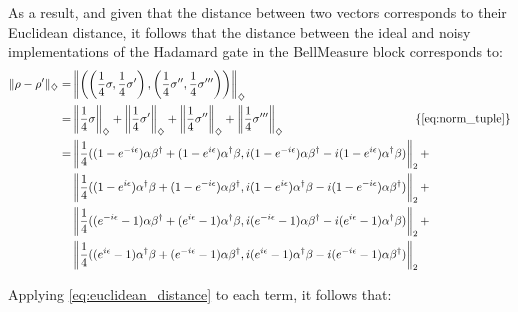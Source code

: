 As a result, and given that the distance between two vectors corresponds to their Euclidean distance, it follows that the distance between the ideal and noisy implementations of the Hadamard gate in the BellMeasure block corresponds to:
\begin{equation}
  \begin{split}
  \lVert \rho-\rho' \rVert_{\diamondsuit} = & \left\lVert \left( \left( \frac{1}{4} \sigma,\frac{1}{4} \sigma'  \right),  \left(\frac{1}{4} \sigma'',\frac{1}{4} \sigma''' \right)\right) \right\rVert_{\diamondsuit} \\
  = & \left\lVert \frac{1}{4} \sigma \right\rVert_{\diamondsuit} + \left\lVert \frac{1}{4} \sigma' \right\rVert_{\diamondsuit} + \left\lVert \frac{1}{4} \sigma'' \right\rVert_{\diamondsuit} + \left\lVert \frac{1}{4} \sigma''' \right\rVert_{\diamondsuit} \hspace{110pt} \{\text  {\autoref{eq:norm_tuple}}\} \\
  = & \left\lVert \frac{1}{4} ((1-e^{-i\epsilon})\alpha \beta^{\dag}  + (1-e^{i\epsilon})\alpha^{\dag} \beta, i(1-e^{-i\epsilon})\alpha \beta^{\dag}-i(1-e^{i\epsilon})\alpha^{\dag} \beta) \right\rVert_{2} + \\
  & \left\lVert \frac{1}{4} ((1-e^{i\epsilon}) \alpha^{\dag} \beta + (1-e^{-i\epsilon}) \alpha \beta^{\dag}, i(1-e^{i\epsilon}) \alpha^{\dag} \beta  - i(1-e^{-i\epsilon}) \alpha \beta^{\dag}) \right\rVert_{2} + \\
  & \left\lVert \frac{1}{4} ((e^{-i\epsilon}-1) \alpha \beta^{\dag}  + (e^{i\epsilon}-1) \alpha^{\dag} \beta, i(e^{-i\epsilon}-1) \alpha \beta^{\dag}  - i(e^{i\epsilon}-1) \alpha^{\dag} \beta) \right\rVert_{2} + \\
  & \left\lVert \frac{1}{4} ((e^{i\epsilon}-1) \alpha^{\dag} \beta  + (e^{-i\epsilon}-1) \alpha \beta^{\dag}, i(e^{i\epsilon}-1) \alpha^{\dag} \beta  - i(e^{-i\epsilon}-1) \alpha \beta^{\dag}) \right\rVert_{2}  \\
\end{split}
\end{equation}

Applying \autoref{eq:euclidean_distance} to each term, it follows that:

